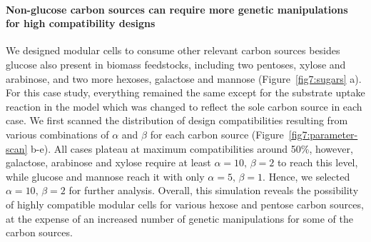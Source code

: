 \documentclass[12pt]{article}
\begin{document}
{\paragraph{Non-glucose carbon sources can require more genetic manipulations for high compatibility designs}
We designed modular cells to consume other relevant carbon sources besides glucose also present in biomass feedstocks, including two pentoses, xylose and arabinose, and two more hexoses, galactose and mannose (Figure~\ref{fig7:sugars} a).
For this case study, everything remained the same except for the substrate uptake reaction in the model which was changed to reflect the sole carbon source in each case.
We first scanned the distribution of design compatibilities resulting from various combinations of $\alpha$ and $\beta$ for each carbon source (Figure~\ref{fig7:parameter-scan} b-e).
All cases plateau at maximum compatibilities around 50\%, however, galactose, arabinose and xylose require at least $\alpha=10, \, \beta=2$ to reach this level, while glucose and mannose reach it with only $\alpha=5, \, \beta=1$.
Hence, we selected $\alpha=10, \, \beta=2$ for further analysis.
Overall, this simulation reveals the possibility of highly compatible modular cells for various hexose and pentose carbon sources, at the expense of an increased number of genetic manipulations for some of the carbon sources.


}
\end{document}
